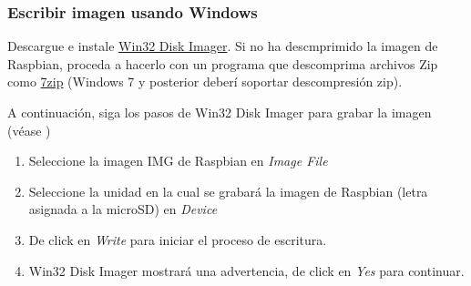 \documentclass[letterpaper,10.5pt]{article}
\begin{document}
\subsubsection{Escribir imagen usando Windows}%
Descargue e instale \href{https://sourceforge.net/projects/win32diskimager/}{Win32 Disk Imager}.
Si no ha descmprimido la imagen de Raspbian, proceda a hacerlo con un programa que descomprima archivos Zip como \href{https://www.7-zip.org/download.html}{7zip} (Windows 7 y posterior deberí soportar descompresión zip).

A continuación, siga los pasos de Win32 Disk Imager para grabar la imagen (véase )
\begin{enumerate}[noitemsep]
	\item Seleccione la imagen IMG de Raspbian en \emph{Image File}
	\item Seleccione la unidad en la cual se grabará la imagen de Raspbian (letra asignada a la microSD) en \emph{Device}
	\item De click en \emph{Write} para iniciar el proceso de escritura.
	\item Win32 Disk Imager mostrará una advertencia, de click en \emph{Yes} para continuar.
\end{enumerate}
\end{document}
